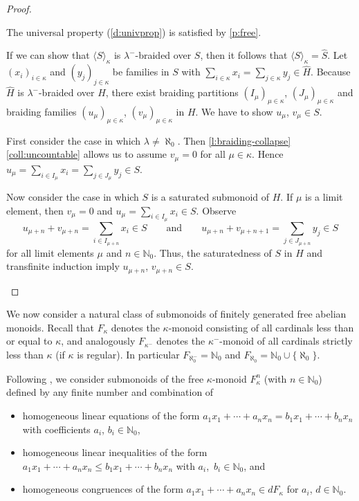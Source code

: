 \documentclass[a4paper,11pt,oneside]{amsart}
\theoremstyle{remark}
\newcommand{\bN}{\mathbb N}
\begin{document}
\begin{proof}
  \begin{proofenumerate}
  \item[\ref{ext-basic:free}]
  The universal property (\cref{d:univprop}) is satisfied by \cref{p:free}.

\item[\ref{ext-basic:sub}]
  If we can show that $\langle S \rangle_\kappa$ is $\lambda^-$-braided over $S$, then it follows that  $\langle S \rangle_\kappa=\widehat S$.
  Let $(x_i)_{i \in \kappa}$ and $(y_j)_{j \in \kappa}$ be families in $S$ with $\sum_{i \in \kappa} x_i = \sum_{j \in \kappa} y_j \in \widehat H$.
  Because $\widehat H$ is $\lambda^-$-braided over $H$, there exist braiding partitions $(I_\mu)_{\mu \in \kappa}$, $(J_\mu)_{\mu \in \kappa}$ and braiding families $(u_\mu)_{\mu \in \kappa}$, $(v_\mu)_{\mu \in \kappa}$ in $H$.
  We have to show $u_\mu$, $v_\mu \in S$.

  First consider the case in which $\lambda \ne \aleph_0$.
  Then \cref{l:braiding-collapse}\ref{coll:uncountable} allows us to assume $v_\mu = 0$ for all $\mu \in \kappa$.
  Hence $u_\mu = \sum_{i \in I_\mu} x_i = \sum_{j \in J_\mu} y_j \in S$.

  Now consider the case in which $S$ is a saturated submonoid of $H$.
  If $\mu$ is a limit element, then $v_\mu = 0$ and $u_\mu = \sum_{i \in I_\mu} x_i \in S$.
  Observe
  \[
    u_{\mu+n} + v_{\mu+n} = \sum_{i \in I_{\mu + n}} x_i \in S\qquad \text{and}\qquad u_{\mu+n} + v_{\mu+n+1} = \sum_{j \in J_{\mu + n}} y_j \in S
  \]
  for all limit elements $\mu$ and $n \in \bN_0$.
  Thus, the saturatedness of $S$ in $H$ and transfinite induction imply $u_{\mu+n}$, $v_{\mu + n} \in S$. \qedhere
  \end{proofenumerate}
\end{proof}

We now consider a natural class of submonoids of finitely generated free abelian monoids.
Recall that $F_{\kappa}$ denotes the $\kappa$-monoid consisting of all cardinals less than or equal to $\kappa$, and analogously $F_{\kappa^-}$ denotes the $\kappa^-$-monoid of all cardinals strictly less than $\kappa$ (if $\kappa$ is regular).
In particular $F_{\aleph_0^-}=\bN_0$ and $F_{\aleph_0} = \bN_0 \cup \{\aleph_0\}$.

Following \cite{PavelHerbera,infinitepullback}, we consider submonoids of the free $\kappa$-monoid $F_\kappa^n$ (with $n \in \bN_0$) defined by any finite number and combination of
\begin{itemize}
\item homogeneous linear equations of the form $a_1x_1+\cdots + a_nx_n=b_1x_1+ \cdots + b_n x_n$ with coefficients $a_i$, $b_i \in \bN_0$,
\item homogeneous linear inequalities of the form $a_1x_1+\cdots + a_nx_n \le b_1x_1+ \cdots + b_n x_n$ with $a_i$,~$b_i \in \bN_0$, and
\item homogeneous congruences of the form $a_1 x_1 + \cdots + a_n x_n \in d F_\kappa$ for $a_i$, $d \in \bN_0$.
\end{itemize}
\end{document}
